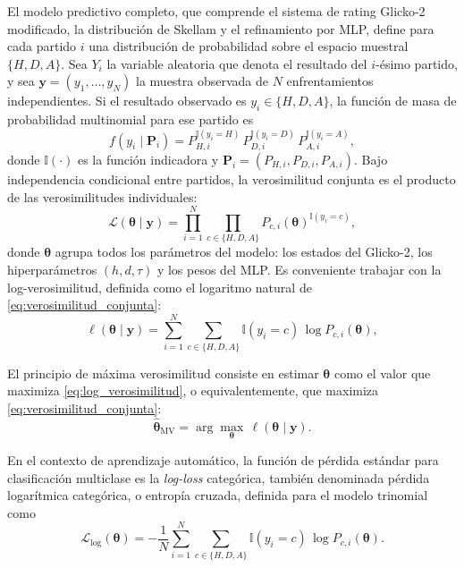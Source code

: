El modelo predictivo completo, que comprende el sistema de rating Glicko-2 modificado, la distribuci\'on de Skellam y el refinamiento por MLP, define para cada partido $i$ una distribuci\'on de probabilidad sobre el espacio muestral $\{H,D,A\}$. Sea $Y_i$ la variable aleatoria que denota el resultado del $i$-\'esimo partido, y sea $\mathbf{y} = (y_1,\dots,y_N)$ la muestra observada de $N$ enfrentamientos independientes. Si el resultado observado es $y_i \in \{H,D,A\}$, la funci\'on de masa de probabilidad multinomial para ese partido es
\begin{equation}\label{eq:multinomial_partido}
	f(y_i \mid \mathbf{P}_i) = P_{H,i}^{\mathbb{I}(y_i=H)}\,P_{D,i}^{\mathbb{I}(y_i=D)}\,P_{A,i}^{\mathbb{I}(y_i=A)},
\end{equation}
donde $\mathbb{I}(\cdot)$ es la funci\'on indicadora y $\mathbf{P}_i = (P_{H,i},P_{D,i},P_{A,i})$. Bajo independencia condicional entre partidos, la verosimilitud conjunta es el producto de las verosimilitudes individuales:
\begin{equation}\label{eq:verosimilitud_conjunta}
	\mathcal{L}(\boldsymbol{\theta} \mid \mathbf{y}) = \prod_{i=1}^{N} \prod_{c\in\{H,D,A\}} P_{c,i}(\boldsymbol{\theta})^{\mathbb{I}(y_i=c)},
\end{equation}
donde $\boldsymbol{\theta}$ agrupa todos los par\'ametros del modelo: los estados del Glicko-2, los hiperpar\'ametros $(h,d,\tau)$ y los pesos del MLP. Es conveniente trabajar con la log-verosimilitud, definida como el logaritmo natural de \eqref{eq:verosimilitud_conjunta}:
\begin{equation}\label{eq:log_verosimilitud}
	\ell(\boldsymbol{\theta} \mid \mathbf{y}) = \sum_{i=1}^{N}\sum_{c\in\{H,D,A\}} \mathbb{I}(y_i=c)\,\log P_{c,i}(\boldsymbol{\theta}),
\end{equation}

El principio de m\'axima verosimilitud consiste en estimar $\boldsymbol{\theta}$ como el valor que maximiza \eqref{eq:log_verosimilitud}, o equivalentemente, que maximiza \eqref{eq:verosimilitud_conjunta}:
\begin{equation}\label{eq:mle}
	\hat{\boldsymbol{\theta}}_{\mathrm{MV}} = \arg\max_{\boldsymbol{\theta}}\,\ell(\boldsymbol{\theta} \mid \mathbf{y}).
\end{equation}

En el contexto de aprendizaje autom\'atico, la funci\'on de p\'erdida est\'andar para clasificaci\'on multiclase es la \emph{log-loss} categ\'orica, tambi\'en denominada p\'erdida logar\'itmica categ\'orica, o entrop\'ia cruzada, definida para el modelo trinomial como
\begin{equation}\label{eq:logloss}
	\mathcal{L}_{\mathrm{log}}(\boldsymbol{\theta}) = -\frac{1}{N}\sum_{i=1}^{N}\sum_{c\in\{H,D,A\}} \mathbb{I}(y_i=c)\,\log P_{c,i}(\boldsymbol{\theta}).
\end{equation}

